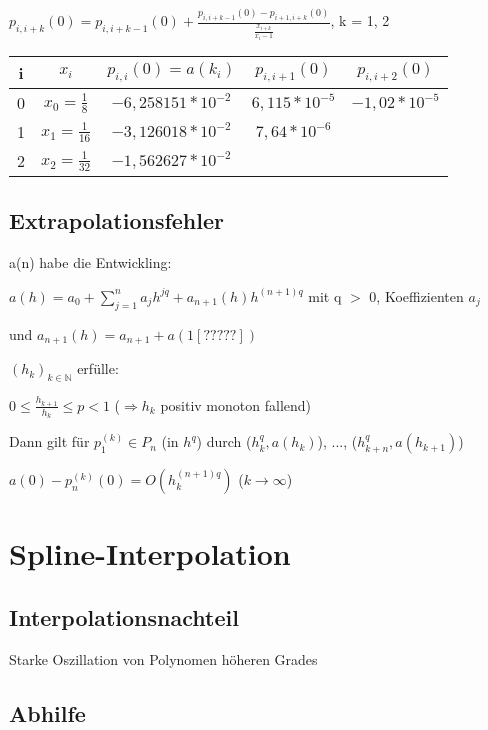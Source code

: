 \documentclass[12pt,a4paper]{article} %
\newcommand*\tab[1][1cm]{\hspace*{#1}}
\begin{document}
	$p_{i, i + k}(0) = p_{i, i + k - 1}(0) + \frac{p_{i, i + k - 1}(0) - p_{i + 1, i + k}(0)}{\frac{x_{i + k}}{x_i - 1}}$, k = 1, 2
	
	\begin{tabular}{ c | c | c | c | c }
		i & $x_i$ & $p_{i, i}(0) = a(k_i)$ & $p_{i, i + 1}(0)$ & $p_{i, i + 2}(0)$ \\ \hline
		0 & $x_0 = \frac{1}{8}$ & $-6,258151 * 10^{-2}$ & $6,115 * 10^{-5}$ & $-1,02 * 10^{-5}$ \\
		1 & $x_1 = \frac{1}{16}$ & $-3,126018 * 10^{-2}$ & $7,64 * 10^{-6}$ & \\
		2 & $x_2 = \frac{1}{32}$ & $-1,562627 * 10^{-2}$ & & 
	\end{tabular}

	\subsection{Extrapolationsfehler}
	
	a(n) habe die Entwickling:
	
	$a(h) = a_0 + \sum\limits_{j = 1}^{n}a_jh^{jq} + a_{n + 1}(h)h^{(n+1)q}$ \tab mit q $>$ 0,
	 Koeffizienten $a_j$ 
	 
	und $a_{n + 1}(h) = a_{n + 1} + a(1[?????])$
	
	$(h_k)_{k \in \mathbb{N}}$ erfülle:
	
	$0 \le \frac{h_{k + 1}}{h_k} \le p < 1$ ($\Rightarrow h_k$ positiv monoton fallend)
	
	Dann gilt für $p_1^{(k)} \in P_n$ (in $h^q$) durch ($h_k^q, a(h_k)$), ..., ($h_{k +n}^q, a(h_{k + 1})$)
	
	$a(0) - p_n^{(k)}(0) = O(h_k^{(n + 1)q})$ \tab ($k \rightarrow \infty$)
	
	\newpage
	
	\section{Spline-Interpolation}
	
	\subsection{Interpolationsnachteil}
	
	Starke Oszillation von Polynomen höheren Grades
	
	\subsection{Abhilfe}
	
\end{document}
